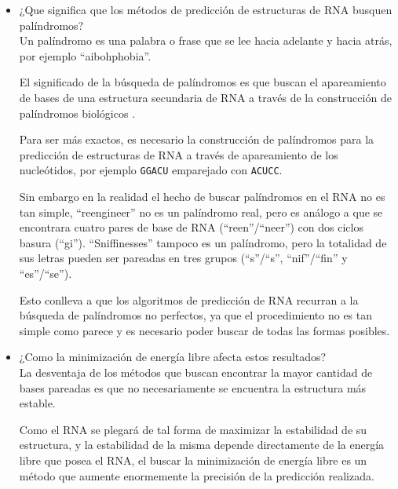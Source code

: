 \documentclass[letter, 10pt]{article}
\begin{document}
\begin{itemize} 

\item ¿Que significa que los métodos de predicción de estructuras de RNA busquen
palíndromos? \\

Un palíndromo es una palabra o frase que se lee hacia adelante y hacia atrás,
por ejemplo ``aibohphobia''.

El significado de la búsqueda de palíndromos es que buscan el apareamiento
de bases de una estructura secundaria de RNA a través de la
construcción de palíndromos biológicos \cite{palindrome}.

Para ser más exactos, es necesario la construcción de 
palíndromos para la predicción de estructuras de RNA a través de apareamiento 
de los nucleótidos, por ejemplo \texttt{GGACU} emparejado con \texttt{ACUCC}.

Sin embargo en la realidad el hecho de buscar palíndromos en el RNA no es tan
simple, ``reengineer''  no es un palíndromo real, pero es análogo a que se
encontrara cuatro pares de base de RNA (``reen''/``neer'') con dos ciclos
basura (``gi''). ``Sniffinesses'' tampoco es un palíndromo, pero la totalidad
de sus letras pueden ser pareadas en tres grupos 
(``s''/``s'', ``nif''/``fin'' y ``es''/``se'').

Esto conlleva a que los algoritmos de predicción de RNA recurran
a la búsqueda de palíndromos no perfectos, ya que el procedimiento
no es tan simple como parece y es necesario poder buscar de todas
las formas posibles.


\item ¿Como la minimización de energía libre afecta estos resultados? \\

La desventaja de los métodos que buscan encontrar la mayor cantidad de bases
pareadas es que no necesariamente se encuentra la estructura más estable.~\cite{diapos}

Como el RNA se plegará de tal forma de maximizar la estabilidad de su
estructura, y la estabilidad de la misma depende directamente de la energía
libre que posea el RNA, el buscar la minimización de energía libre es un
método que aumente enormemente la precisión de la predicción realizada.


\end{itemize}
\end{document}
